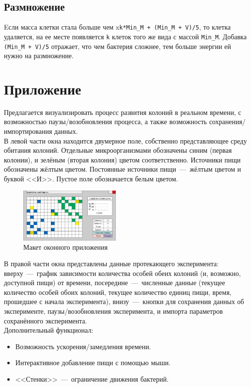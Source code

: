 \documentclass[11pt,twoside,twocolumn,russian,a4paper]{article}
\begin{document}
\subsection{Размножение}
	Eсли масса клетки стала больше чем x\texttt{k*Min\_M + (Min\_M + V)/5}, то клетка удаляется, на ее месте появляется \texttt{k} клеток того же вида с массой \texttt{Min\_M}. 
	Добавка \texttt{(Min\_M + V)/5} отражает, что чем бактерия сложнее, тем больше энергии ей нужно на размножение.
\section{Приложение}

\noindent Предлагается визуализировать процесс развития колоний в реальном времени, с возможностью паузы/возобновления процесса, а также возможность сохранения/импортирования данных. \smallskip\\
\noindent В левой части окна находится двумерное поле, собственно представляющее среду обитания колоний. Отдельные микроорганизмами обозначены синим (первая колонии), и зелёным (вторая колония) цветом соответственно. Источники пищи обозначены жёлтым цветом. Постоянные источники пищи~---~жёлтым цветом и буквой <<И>>. Пустое поле обозначается белым цветом.\smallskip

\begin{figure}[h]
	\centering
	\includegraphics[width=0.45\textwidth]{scheme_big}
	\caption{Макет оконного приложения}
\end{figure}

\noindent В правой части окна представлены данные протекающего эксперимента: вверху~---~график зависимости количества особей обеих колоний (и, возможно, доступной пищи) от времени, посередине~---~численные данные (текущее количество особей обоих колоний, текущее количество единиц пищи, время, прошедшее с начала эксперимента), внизу~---~кнопки для сохранения данных об эксперименте, паузы/возобновления эксперимента, и импорта параметров сохранённого эксперимента.\smallskip\\
\noindent Дополнительный функционал:
\begin{itemize}
	\item Возможность ускорения/замедления времени.
	\item Интерактивное добавление пищи с помощью мыши.
	\item <<Стенки>>~---~ограничение движения бактерий.
\end{itemize}
\end{document}
